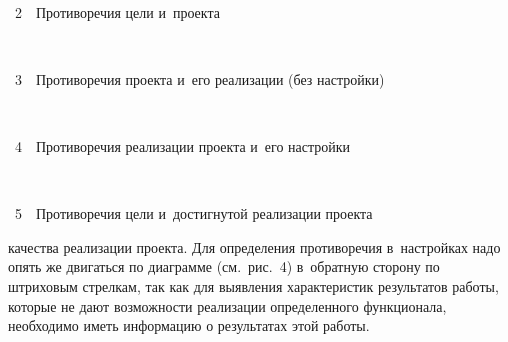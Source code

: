 \begin{multicols}{2}
{ \begin{center}  %
 \vspace*{-6pt}
   \mbox{%
 \epsfxsize=16mm 
 }


\vspace*{6pt}


\noindent
{{\figurename~2}\ \ \small{Противоречия цели и~проекта}}
\end{center}
}


\addtocounter{figure}{1}

{ \begin{center}  %
 \vspace*{6pt}
    \mbox{%
 \epsfxsize=79mm 
 }


\end{center}

\vspace*{-2pt}


\noindent
{{\figurename~3}\ \ \small{Противоречия проекта и~его реализации (без настройки)}}
}

\vspace*{6pt}

\addtocounter{figure}{1}

{ \begin{center}  %
 \vspace*{1pt}
   \mbox{%
 \epsfxsize=54.5mm 
 }


\end{center}


\noindent
{{\figurename~4}\ \ \small{Противоречия реализации проекта и~его на\-стройки}}
}


\addtocounter{figure}{1}

{ \begin{center}  %
 \vspace*{5pt}
    \mbox{%
 \epsfxsize=79mm 
 }


\end{center}



\noindent
{{\figurename~5}\ \ \small{Противоречия цели и~достигнутой реализации проекта}}
}

\vspace*{6pt}

\addtocounter{figure}{1}

\noindent
 качества реализации проекта. Для 
определения противоречия в~настройках надо опять же двигаться по диаграмме 
(см.\ рис.~4) в~обратную сторону по штриховым стрелкам, так как для выявления 
характеристик результатов работы, которые не дают возможности реализации 
определенного функционала, необходимо иметь информацию о результатах этой 
работы. 



\end{multicols}
